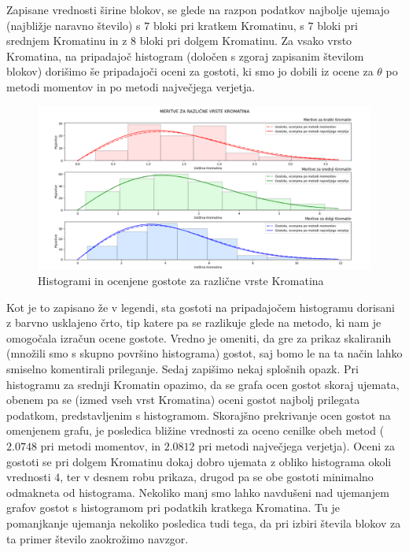 \documentclass{article}
\begin{document}
Zapisane vrednosti širine blokov, se glede na razpon podatkov najbolje ujemajo (najbližje naravno število) s $7$ bloki pri kratkem Kromatinu, s $7$ bloki pri srednjem Kromatinu in z $8$ bloki pri dolgem Kromatinu. 
Za vsako vrsto Kromatina, na pripadajoč histogram (določen s zgoraj zapisanim številom blokov) dorišimo še pripadajoči oceni za gostoti, ki smo jo dobili iz ocene za $\theta$ po metodi momentov in po metodi največjega verjetja. 
\begin{figure}[H]
    \begin{center}
    \includegraphics[width=\linewidth]{naloga2f.png}
    \vspace*{-5mm}\caption{Histogrami in ocenjene gostote za različne vrste Kromatina}
    \end{center}    
\end{figure}
Kot je to zapisano že v legendi, sta gostoti na pripadajočem histogramu dorisani z barvno usklajeno črto, tip katere pa se razlikuje glede na metodo, ki nam je omogočala izračun ocene gostote.
Vredno je omeniti, da gre za prikaz skaliranih (množili smo s skupno površino histograma) gostot, saj bomo le na ta način lahko smiselno komentirali prileganje. 
\newline
Sedaj zapišimo nekaj splošnih opazk.
Pri histogramu za srednji Kromatin opazimo, da se grafa ocen gostot skoraj ujemata, obenem pa se (izmed vseh vrst Kromatina) oceni gostot najbolj prilegata podatkom, predstavljenim s histogramom. 
Skorajšno prekrivanje ocen gostot na omenjenem grafu, je posledica bližine vrednosti za oceno cenilke obeh metod ($2.0748$ pri metodi momentov,  in $2.0812$ pri metodi največjega verjetja).
Oceni za gostoti se pri dolgem Kromatinu dokaj dobro ujemata z obliko histograma okoli vrednosti $4$, ter v desnem robu prikaza, drugod pa se obe gostoti minimalno odmakneta od histograma. 
Nekoliko manj smo lahko navdušeni nad ujemanjem grafov gostot s histogramom pri podatkih kratkega Kromatina. Tu je pomanjkanje ujemanja nekoliko posledica tudi tega, da pri izbiri števila blokov za ta primer število zaokrožimo navzgor.
\end{document}
